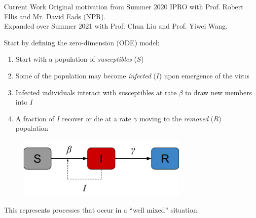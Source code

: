 \begin{slide}{Current Work}
	Original motivation from Summer 2020 IPRO with Prof. Robert Ellis and Mr. David Eads (NPR). \\
	Expanded over Summer 2021 with Prof. Chun Liu and Prof. Yiwei Wang. \\
	
	\vspace{.5cm}
	
	{\large Start by defining the zero-dimension (ODE) model:}
	\begin{enumerate}
		\item Start with a population of \emph{susceptibles} ($S$)
		\item Some of the population may become \emph{infected} ($I$) upon emergence of the virus
		\item Infected individuals interact with susceptibles at rate $\beta$ to draw new members into $I$
		\item A fraction of $I$ recover or die at a rate $\gamma$ moving to the \emph{removed} ($R$) population
	\end{enumerate}
	\begin{figure}
		\centering
		\includegraphics[height=3cm]{images/sir_schematic}
	\end{figure}
	This represents processes that occur in a ``well mixed'' situation.
\end{slide}